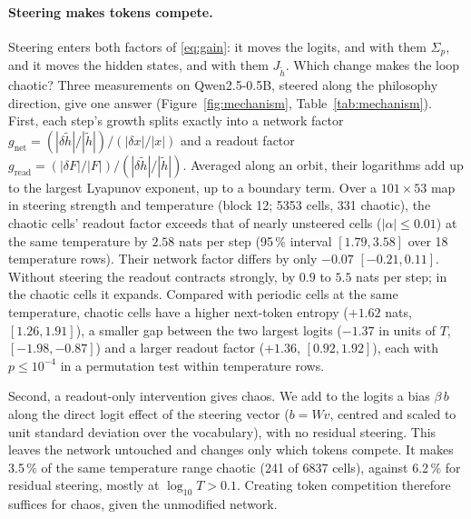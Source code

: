 \paragraph{Steering makes tokens compete.} Steering enters both factors of \eqref{eq:gain}: it moves the logits, and
with them $\Sigma_p$, and it moves the hidden states, and with them $J_{\tilde h}$. Which change makes the loop
chaotic? Three measurements on Qwen2.5-0.5B, steered along the philosophy direction, give one answer
(Figure~\ref{fig:mechanism}, Table~\ref{tab:mechanism}). First, each step's growth splits exactly into a network
factor $g_{\mathrm{net}}=(|\delta\tilde h|/|\tilde h|)/(|\delta x|/|x|)$ and a readout factor
$g_{\mathrm{read}}=(|\delta F|/|F|)/(|\delta\tilde h|/|\tilde h|)$. Averaged along an orbit, their logarithms add up
to the largest Lyapunov exponent, up to a boundary term. Over a $101\times53$ map in steering strength and temperature
(block 12; 5353 cells, 331 chaotic), the chaotic cells' readout factor exceeds that of nearly unsteered cells
($|\alpha|\le0.01$) at the same temperature by $2.58$ nats per step (95\,\% interval $[1.79,3.58]$ over 18 temperature
rows). Their network factor differs by only $-0.07$ $[-0.21,0.11]$. Without steering the readout contracts strongly,
by $0.9$ to $5.5$ nats per step; in the chaotic cells it expands. Compared with periodic cells at the same temperature,
chaotic cells have a higher next-token entropy ($+1.62$ nats, $[1.26,1.91]$), a smaller gap between the two largest
logits ($-1.37$ in units of $T$, $[-1.98,-0.87]$) and a larger readout factor ($+1.36$, $[0.92,1.92]$), each with
$p\le10^{-4}$ in a permutation test within temperature rows.

Second, a readout-only intervention gives chaos. We add to the logits a bias $\beta\,b$ along the direct logit effect
of the steering vector ($b=Wv$, centred and scaled to unit standard deviation over the vocabulary), with no residual
steering. This leaves the network untouched and changes only which tokens compete. It makes 3.5\,\% of the same
temperature range chaotic (241 of 6837 cells), against 6.2\,\% for residual steering, mostly at
$\log_{10}T>0.1$. Creating token competition therefore suffices for chaos, given the unmodified network.

